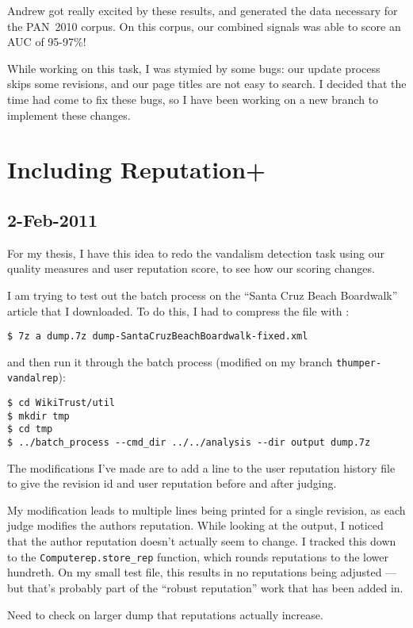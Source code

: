 Andrew got really excited by these results, and generated the data
necessary for the PAN~2010 corpus.
On this corpus, our combined signals was able to score an AUC of 95-97\%!

While working on this task, I was stymied by some \wikitrust bugs:
our update process skips some revisions, and our page titles are not
easy to search.
I decided that the time had come to fix these bugs, so I have been
working on a new branch to implement these changes.

\section{Including Reputation+}

\subsection{2-Feb-2011}

For my thesis, I have this idea to redo the vandalism detection task
using our quality measures and user reputation score, to see how
our scoring changes.

I am trying to test out the batch process on the
``Santa Cruz Beach Boardwalk'' article that I downloaded.
To do this, I had to compress the file with :
\begin{verbatim}
$ 7z a dump.7z dump-SantaCruzBeachBoardwalk-fixed.xml
\end{verbatim}
and then run it through the batch process (modified on
my branch \texttt{thumper-vandalrep}):
\begin{verbatim}
$ cd WikiTrust/util
$ mkdir tmp
$ cd tmp
$ ../batch_process --cmd_dir ../../analysis --dir output dump.7z
\end{verbatim}
The modifications I've made are to add a line to the
user reputation history file to give the revision id
and user reputation before and after judging.

My modification leads to multiple lines being printed
for a single revision, as each judge modifies the authors reputation.
While looking at the output, I noticed that the author reputation
doesn't actually seem to change.
I tracked this down to the \texttt{Computerep.store\_rep}
function, which rounds reputations to the lower hundreth.
On my small test file, this results in no reputations being
adjusted --- but that's probably part of the ``robust reputation''
work that has been added in.

Need to check on larger dump that reputations actually increase.

